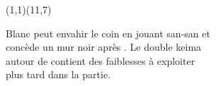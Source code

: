 \documentclass[preview, border=0pt, varwidth=false]{standalone}
\begin{document}
	\setgounit{0.6cm} 
	
\parbox[c][14.65cm][c]{10.2cm}{
	\centering
	
	
	\begin{psgopartialboard}{(1,1)(11,7)}
		\pass
	\end{psgopartialboard}
	
	\vspace{1em}
	Blanc peut envahir le coin en jouant san-san  et \\ concède un mur noir après . Le double keima  \\ autour de  contient des faiblesses à exploiter \\ plus tard dans la partie.
}
\end{document}
